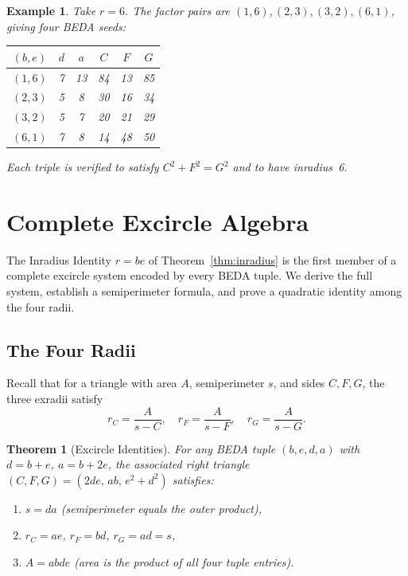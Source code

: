 \documentclass[12pt]{article}
\newtheorem{theorem}{Theorem}
\newtheorem{example}{Example}
\begin{document}
\begin{example}
Take $r = 6$.  The factor pairs are $(1,6),(2,3),(3,2),(6,1)$, giving four BEDA seeds:
\begin{center}
\begin{tabular}{cccccc}
\toprule
$(b,e)$ & $d$ & $a$ & $C$ & $F$ & $G$ \\
\midrule
$(1,6)$ & 7 & 13 & 84 & 13 & 85 \\
$(2,3)$ & 5 & 8  & 30 & 16 & 34 \\
$(3,2)$ & 5 & 7  & 20 & 21 & 29 \\
$(6,1)$ & 7 & 8  & 14 & 48 & 50 \\
\bottomrule
\end{tabular}
\end{center}
Each triple is verified to satisfy $C^2 + F^2 = G^2$ and to have inradius~6.
\end{example}

\section{Complete Excircle Algebra}\label{sec:excircle}

The Inradius Identity $r = be$ of Theorem~\ref{thm:inradius} is the first member of
a complete excircle system encoded by every BEDA tuple.  We derive the full system,
establish a semiperimeter formula, and prove a quadratic identity among the four radii.

\subsection{The Four Radii}

Recall that for a triangle with area $A$, semiperimeter $s$, and sides $C,F,G$,
the three exradii satisfy
\[
  r_C = \frac{A}{s-C},\quad r_F = \frac{A}{s-F},\quad r_G = \frac{A}{s-G}.
\]

\begin{theorem}[Excircle Identities]\label{thm:excircle}
For any BEDA tuple $(b,e,d,a)$ with $d = b+e$, $a = b+2e$, the associated right
triangle $(C,F,G)=(2de,\,ab,\,e^2+d^2)$ satisfies:
\begin{enumerate}
\item $s = da$ \quad\emph{(semiperimeter equals the outer product)},
\item $r_C = ae$, \quad $r_F = bd$, \quad $r_G = ad = s$,
\item $A = abde$ \quad\emph{(area is the product of all four tuple entries)}.
\end{enumerate}
\end{theorem}
\end{document}
